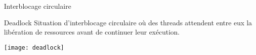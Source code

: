 
\begingroup

\begin{frame}{Interblocage circulaire}

  \begin{block}{Deadlock}
    Situation  d'\alert{interblocage circulaire}  où  des threads  attendent
    entre eux la libération de ressources avant de continuer leur exécution.
  \end{block}

  \begin{center}
    \texttt{[image: deadlock]}
  \end{center}

\end{frame}

\endgroup
\endinput
